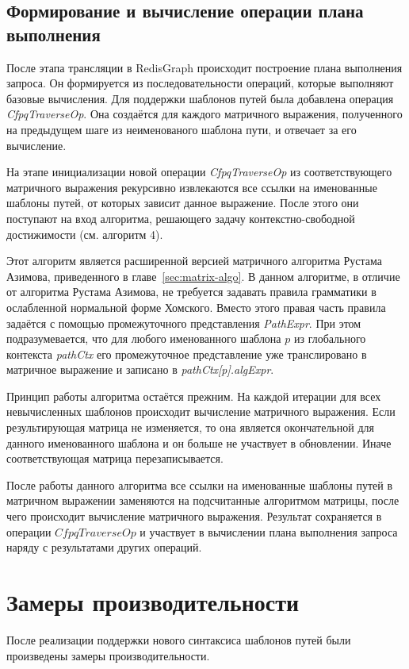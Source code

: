 \subsection{Формирование и вычисление операции плана выполнения}
После этапа трансляции в RedisGraph происходит построение плана выполнения запроса. Он формируется из последовательности операций, которые выполняют базовые вычисления. Для поддержки шаблонов путей была добавлена операция \textit{CfpqTraverseOp}. Она создаётся для каждого матричного выражения, полученного на предыдущем шаге из неименованого шаблона пути, и отвечает за его вычисление.

На этапе инициализации новой операции \textit{CfpqTraverseOp} из соответствующего матричного выражения рекурсивно извлекаются все ссылки на именованные шаблоны путей, от которых зависит данное выражение. После этого они поступают на вход алгоритма, решающего задачу контекстно-свободной достижимости (см. алгоритм 4).

Этот алгоритм является расширенной версией матричного алгоритма Рустама Азимова, приведенного в главе~\ref{sec:matrix-algo}. В данном алгоритме, в отличие от алгоритма Рустама Азимова, не требуется задавать правила грамматики в ослабленной нормальной форме Хомского. Вместо этого правая часть правила задаётся с помощью промежуточного представления \textit{PathExpr}. При этом подразумевается, что для любого именованного шаблона $p$ из глобального контекста \textit{pathCtx} его промежуточное представление уже транслировано в матричное выражение и записано в \textit{pathCtx[p].algExpr}.

Принцип работы алгоритма остаётся прежним. На каждой итерации для всех невычисленных шаблонов происходит вычисление матричного выражения. Если результирующая матрица не изменяется, то она является окончательной для данного именованного шаблона и он больше не участвует в обновлении. Иначе соответствующая матрица перезаписывается.

После работы данного алгоритма все ссылки на именованные шаблоны путей в матричном выражении заменяются на подсчитанные алгоритмом матрицы, после чего происходит вычисление матричного выражения. Результат сохраняется в операции $CfpqTraverseOp$ и участвует в вычислении плана выполнения запроса наряду с результатами других операций. 


\section{Замеры производительности}
После реализации поддержки нового синтаксиса шаблонов путей были произведены замеры производительности.

